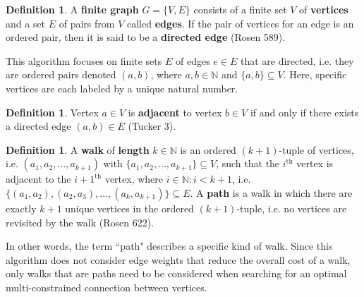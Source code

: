 \documentclass[12pt]{amsart}
\theoremstyle{definition}
\newtheorem{definition}[thm]{Definition}
\theoremstyle{remark}
\numberwithin{equation}{section}
\newcommand{\N}{\mathbb{N}}
\begin{document}
\begin{definition}
A \textbf{finite graph} $G = \{V,E\}$ consists of a finite set $V$ of \textbf{vertices} and a set $E$ of pairs from $V$ called \textbf{edges}. If the pair of vertices for an edge is an ordered pair, then it is said to be a \textbf{directed edge} (Rosen 589). 
\end{definition}

This algorithm focuses on finite sets $E$ of edges $e \in E$ that are directed, i.e. they are ordered pairs denoted $(a, b)$, where $a, b \in \N$ and $\{a, b\} \subseteq V$.  Here, specific vertices are each labeled by a unique natural number.

\begin{definition}
Vertex $a \in V$ is \textbf{adjacent} to vertex $b \in V$ if and only if there exists a directed edge $(a, b) \in E$ (Tucker 3).
\end{definition}

\newpage

\begin{definition}
A \textbf{walk} of \textbf{length} $k \in \N$ is an ordered $(k+1)$-tuple of vertices, i.e. $(a_1, a_2, \ldots, a_{k+1})$ with $\{a_1, a_2, \ldots, a_{k+1}\} \subseteq V$, such that the $i^\text{th}$ vertex is adjacent to the $i+1^\text{th}$ vertex, where $i \in \N : i < k+1$, i.e. $\{(a_1, a_2), (a_2, a_3), \ldots, (a_k, a_{k+1})\} \subseteq E$. A \textbf{path} is a walk in which there are exactly $k+1$ unique vertices in the ordered $(k+1)$-tuple, i.e. no vertices are revisited by the walk (Rosen 622).
\end{definition}

In other words, the term ``path" describes a specific kind of walk. Since this algorithm does not consider edge weights that reduce the overall cost of a walk, only walks that are paths need to be considered when searching for an optimal multi-constrained connection between vertices.
\end{document}
